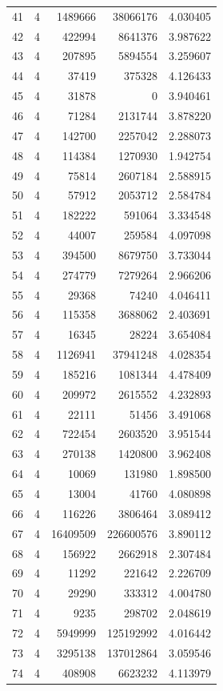 \begin{longtable}{rrrrr}
41 & 4 & 1489666 & 38066176 & 4.030405\\
42 & 4 & 422994 & 8641376 & 3.987622\\
43 & 4 & 207895 & 5894554 & 3.259607\\
44 & 4 & 37419 & 375328 & 4.126433\\
45 & 4 & 31878 & 0 & 3.940461\\
46 & 4 & 71284 & 2131744 & 3.878220\\
47 & 4 & 142700 & 2257042 & 2.288073\\
48 & 4 & 114384 & 1270930 & 1.942754\\
49 & 4 & 75814 & 2607184 & 2.588915\\
50 & 4 & 57912 & 2053712 & 2.584784\\
51 & 4 & 182222 & 591064 & 3.334548\\
52 & 4 & 44007 & 259584 & 4.097098\\
53 & 4 & 394500 & 8679750 & 3.733044\\
54 & 4 & 274779 & 7279264 & 2.966206\\
55 & 4 & 29368 & 74240 & 4.046411\\
56 & 4 & 115358 & 3688062 & 2.403691\\
57 & 4 & 16345 & 28224 & 3.654084\\
58 & 4 & 1126941 & 37941248 & 4.028354\\
59 & 4 & 185216 & 1081344 & 4.478409\\
60 & 4 & 209972 & 2615552 & 4.232893\\
61 & 4 & 22111 & 51456 & 3.491068\\
62 & 4 & 722454 & 2603520 & 3.951544\\
63 & 4 & 270138 & 1420800 & 3.962408\\
64 & 4 & 10069 & 131980 & 1.898500\\
65 & 4 & 13004 & 41760 & 4.080898\\
66 & 4 & 116226 & 3806464 & 3.089412\\
67 & 4 & 16409509 & 226600576 & 3.890112\\
68 & 4 & 156922 & 2662918 & 2.307484\\
69 & 4 & 11292 & 221642 & 2.226709\\
70 & 4 & 29290 & 333312 & 4.004780\\
71 & 4 & 9235 & 298702 & 2.048619\\
72 & 4 & 5949999 & 125192992 & 4.016442\\
73 & 4 & 3295138 & 137012864 & 3.059546\\
74 & 4 & 408908 & 6623232 & 4.113979\\

\end{longtable}
